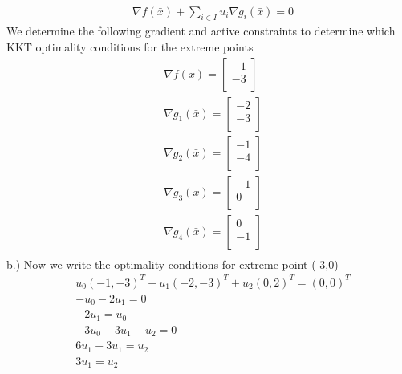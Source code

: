 \documentclass[12pt]{article}
\begin{document}
    \\
    \begin{align*}
        &\nabla f(\bar x) + \sum_{i \in I} u_i \nabla g_i(\bar x) = 0
    \end{align*}
    We determine the following gradient and active constraints to determine which KKT optimality conditions for the extreme points\\
    \begin{align*}
        &\nabla f(\bar x) = 
            \begin{bmatrix}
                -1\\
                -3\\
            \end{bmatrix}\\
        &\nabla g_1(\bar x) = 
            \begin{bmatrix}
                -2\\
                -3\\
            \end{bmatrix}\\
        &\nabla g_2(\bar x) = 
            \begin{bmatrix}
                -1\\
                -4\\
            \end{bmatrix}\\
        &\nabla g_3(\bar x) = 
            \begin{bmatrix}
                -1\\
                0\\
            \end{bmatrix}\\
        &\nabla g_4(\bar x) = 
            \begin{bmatrix}
                0\\
                -1\\
            \end{bmatrix}\\
    \end{align*}
    b.) Now we write the optimality conditions for extreme point (-3,0)\\
    \begin{align*}
        &u_0 (-1,-3)^T + u_1 (-2,-3)^T + u_2 (0,2)^T = (0,0)^T\\
        &-u_0 - 2u_1 = 0\\
        &-2u_1 = u_0\\
        &-3u_0 - 3u_1 - u_2 = 0\\
        &6u_1-3u_1 = u_2\\
        &3u_1 = u_2
    \end{align*}
\end{document}
